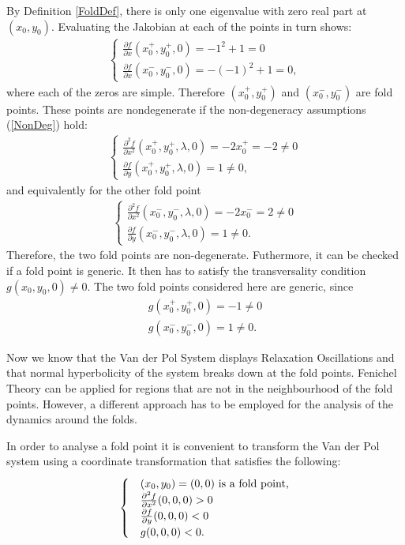 By Definition \ref{FoldDef}, there is only one eigenvalue with zero real part at $(x_0,y_0)$. Evaluating the Jakobian at each of the points in turn shows:
\begin{align*}
\begin{cases}
 \frac{ \partial f}{\partial x}(x_0^+,y_0^+,0) = -1^2 + 1 =0 \\
 \frac{ \partial f}{\partial x}(x_0^-,y_0^-,0) = -(-1)^2 + 1 =0,
\end{cases}
\end{align*}
where each of the zeros are simple.
Therefore $(x_0^+,y_0^+)$ and $(x_0^-,y_0^-)$ are fold points.
These points are nondegenerate if the non-degeneracy assumptions (\ref{NonDeg}) hold:
\begin{align*}
\begin{cases}
\frac{ \partial ^2 f}{ \partial x^2} (x_0^+,y_0^+, \lambda, 0) = -2 x_0^+ = -2 \neq 0 \\
\frac{\partial f}{\partial y}(x_0^+,y_0^+, \lambda, 0) = 1 \neq 0,
\end{cases}
\end{align*}
and equivalently for the other fold point
\begin{align*}
\begin{cases}
\frac{ \partial ^2 f}{ \partial x^2} (x_0^-,y_0^-, \lambda, 0) = -2 x_0^- = 2 \neq 0 \\
\frac{\partial f}{\partial y}(x_0^-,y_0^-, \lambda, 0) = 1 \neq 0.
\end{cases}
\end{align*}
Therefore, the two fold points are non-degenerate.
Futhermore, it can be checked if a fold point is generic. It then has to satisfy the transversality condition $g(x_0,y_0,0) \neq 0$.
The two fold points considered here are generic, since 
\begin{align*}
 g(x_0^+,y_0^+,0)= -1 \neq 0 \\
g(x_0^-,y_0^-,0)= 1 \neq 0.
\end{align*}

Now we know that the Van der Pol System displays Relaxation Oscillations and that normal hyperbolicity of the system breaks down at the fold points. Fenichel Theory can be applied for regions that are not in the neighbourhood of the fold points. However, a different approach has to be employed for the analysis of the dynamics around the folds.

In order to analyse a fold point it is convenient to transform the Van der Pol system using a coordinate transformation that satisfies the following: 
\begin{equation} \label{FoldConditions}
    \begin{cases}
        &\folds=(0,0) \textrm{ is a fold point,}\\
        &\pd{^2f}{x^2}(0,0,0)>0\\
        &\pd{f}{y}(0,0,0)<0\\
        & g(0,0,0) <0.
    \end{cases} 
\end{equation}


